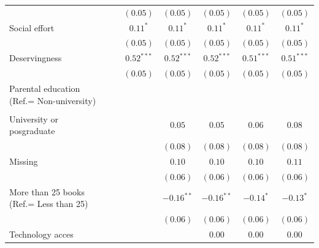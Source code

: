 \documentclass[
  12pt,
  letterpaper,
]{article}
\begin{document}
\begin{table}
{\begin{center}
{\begin{threeparttable}
\begin{tabular}{l c c c c c c}
                                                       &               & $(0.05)$      & $(0.05)$      & $(0.05)$      & $(0.05)$      & $(0.05)$      \\
Social effort                                          &               & $0.11^{*}$    & $0.11^{*}$    & $0.11^{*}$    & $0.11^{*}$    & $0.11^{*}$    \\
                                                       &               & $(0.05)$      & $(0.05)$      & $(0.05)$      & $(0.05)$      & $(0.05)$      \\
Deservingness                                          &               & $0.52^{***}$  & $0.52^{***}$  & $0.52^{***}$  & $0.51^{***}$  & $0.51^{***}$  \\
                                                       &               & $(0.05)$      & $(0.05)$      & $(0.05)$      & $(0.05)$      & $(0.05)$      \\
Parental education (Ref.= Non-university)              &               &               &               &               &               &               \\
                                                       &               &               &               &               &               &               \\
\quad University or posgraduate                        &               &               & $0.05$        & $0.05$        & $0.06$        & $0.08$        \\
                                                       &               &               & $(0.08)$      & $(0.08)$      & $(0.08)$      & $(0.08)$      \\
\quad Missing                                          &               &               & $0.10$        & $0.10$        & $0.10$        & $0.11$        \\
                                                       &               &               & $(0.06)$      & $(0.06)$      & $(0.06)$      & $(0.06)$      \\
More than 25 books (Ref.= Less than 25)                &               &               & $-0.16^{**}$  & $-0.16^{**}$  & $-0.14^{*}$   & $-0.13^{*}$   \\
                                                       &               &               & $(0.06)$      & $(0.06)$      & $(0.06)$      & $(0.06)$      \\
Technology acces                                       &               &               &               & $0.00$        & $0.00$        & $0.00$        \\

\end{tabular}
\end{threeparttable}}
\end{center}}
\end{table}
\end{document}
